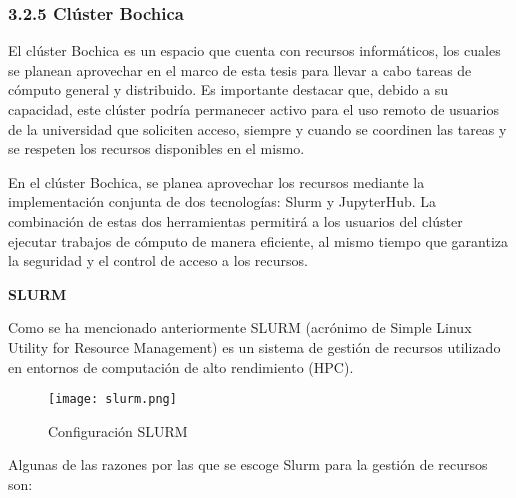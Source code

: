 \begin{spacing}{1.5}
  \subsubsection{3.2.5 Clúster Bochica}

  El clúster Bochica es un espacio que cuenta con recursos informáticos, los cuales se planean aprovechar en el marco de esta tesis para llevar a cabo tareas de cómputo general y distribuido. Es importante destacar que, debido a su capacidad, este clúster podría permanecer activo para el uso remoto de usuarios de la universidad que soliciten acceso, siempre y cuando se coordinen las tareas y se respeten los recursos disponibles en el mismo.

  En el clúster Bochica, se planea aprovechar los recursos mediante la implementación conjunta de dos tecnologías: Slurm y JupyterHub. La combinación de estas dos herramientas permitirá a los usuarios del clúster ejecutar trabajos de cómputo de manera eficiente, al mismo tiempo que garantiza la seguridad y el control de acceso a los recursos.

  \textbf{SLURM}

  Como se ha mencionado anteriormente SLURM (acrónimo de Simple Linux Utility for Resource Management) es un sistema de gestión de recursos utilizado en entornos de computación de alto rendimiento (HPC).

  \begin{figure}[h]
    \centering
    \texttt{[image: slurm.png]}
    \caption{Configuración SLURM \cite{fig4}}
    \label{fig:etiqueta}
  \end{figure}

  Algunas de las razones por las que se escoge Slurm para la gestión de recursos son:\cite{RHEL-SLURM-1}



\end{spacing}
